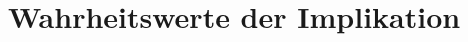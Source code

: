 \documentclass[main.tex]{subfiles}
\begin{document}
\FormulaThmAuto{\bot\lor \bot \eqvdash \bot}
\begin{tabproofsplit}
  \proofpart{$\vdash$}
  \closeproofpart

  \proofpart{$\dashv$}
  \closeproofpart
\end{tabproofsplit}

\section{Wahrheitswerte der Implikation}

\FormulaThmAuto{\top\rightarrow \top \eqvdash \top}
\begin{tabproofsplit}
  \proofpart{$\vdash$}
    \proofstep{}{\top}{\FormulaRefAuto{\top}}
  \closeproofpart

  \proofpart{$\dashv$}
  \closeproofpart
\end{tabproofsplit}

\FormulaThmAuto{\top\rightarrow \bot \eqvdash \bot}
\begin{tabproofsplit}
  \proofpart{$\vdash$}
    \proofstep{}{\top}{\FormulaRefAuto{\top}}
  \closeproofpart

  \proofpart{$\dashv$}
  \closeproofpart
\end{tabproofsplit}

\FormulaThmAuto{\bot\rightarrow \top \eqvdash \top}
\begin{tabproofsplit}
  \proofpart{$\vdash$}
    \proofstep{}{\top}{\FormulaRefAuto{\top}}
  \closeproofpart

  \proofpart{$\dashv$}
  \closeproofpart
\end{tabproofsplit}

\FormulaThmAuto{\bot\rightarrow \bot \eqvdash \top}
\begin{tabproofsplit}
  \proofpart{$\vdash$}
    \proofstep{}{\top}{\FormulaRefAuto{\top}}
  \closeproofpart

  \proofpart{$\dashv$}
  \closeproofpart
\end{tabproofsplit}
\end{document}
